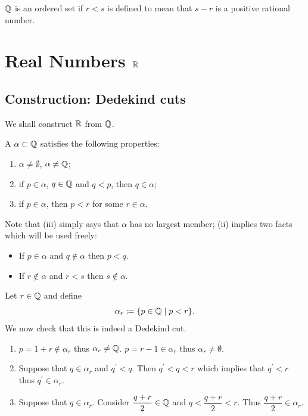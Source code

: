 \begin{theorem}
$\mathbb Q$ is an ordered set if $r<s$ is defined to mean that $s-r$ is a positive rational number.
\end{theorem}
\pagebreak

\section{Real Numbers $\mathbb R$}
\subsection{Construction: Dedekind cuts}
We shall construct $\mathbb R$ from $\mathbb Q$.

\begin{definition}
A  $\alpha\subset\mathbb Q$ satisfies the following properties:
\begin{enumerate}[label=(\roman*)]
\item $\alpha\neq\emptyset$, $\alpha\neq\mathbb Q$;
\item if $p\in\alpha$, $q\in\mathbb Q$ and $q<p$, then $q\in\alpha$;
\item if $p\in\alpha$, then $p<r$ for some $r\in\alpha$.
\end{enumerate}
\end{definition}

Note that (iii) simply says that $\alpha$ has no largest member; (ii) implies two facts which will be used freely:
\begin{itemize}
\item If $p\in\alpha$ and $q\notin\alpha$ then $p<q$.
\item If $r\notin\alpha$ and $r<s$ then $s\notin\alpha$.
\end{itemize}

\begin{example}
Let $r\in\mathbb Q$ and define
\[ \alpha_r\coloneqq\{p\in\mathbb Q\mid p<r\}. \]
We now check that this is indeed a Dedekind cut.
\begin{enumerate}[label=(\arabic*)]
\item $p=1+r\notin\alpha_r$ thus $\alpha_r\neq\mathbb Q$. $p=r-1\in\alpha_r$ thus $\alpha_r\neq\emptyset$.

\item Suppose that $q\in\alpha_r$ and $q^\prime<q$. Then $q^\prime<q<r$ which implies that $q^\prime<r$ thus $q^\prime\in\alpha_r$.

\item Suppose that $q\in\alpha_r$. Consider $\dfrac{q+r}{2}\in\mathbb Q$ and $q<\dfrac{q+r}{2}<r$. Thus $\dfrac{q+r}{2}\in\alpha_r$.
\end{enumerate}
\end{example}

